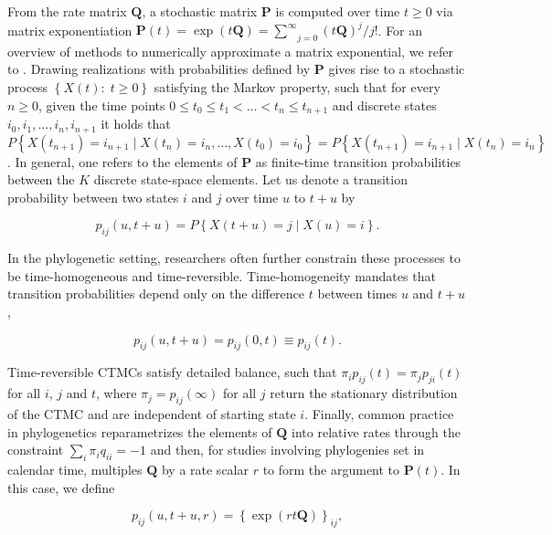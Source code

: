From the rate matrix $\mathbf{Q}$, a stochastic matrix $\mathbf{P}$ is computed over time $t \geq 0$ via matrix exponentiation $\mathbf{P}(t)=
\exp(t\mathbf{Q})
=\underset{j=0}{\overset{\infty}{\sum}}
(t\mathbf{Q})^{j} / j!$. For an overview of methods to numerically approximate a matrix exponential, we refer to \citet{Moler1978}.
%
Drawing realizations with probabilities defined by $\mathbf{P}$ gives rise to a stochastic process $\left\{ X(t):\; t\geq0\right\}$ satisfying the Markov property, such that for every $n\geq 0$, given the time points $0\leq t_{0}\leq t_{1}<\ldots<t_{n}\leq t_{n+1}$ and discrete states $i_{0},i_{1}, \ldots, i_{n},i_{n+1}$ it holds that %
%
$P\left\{ X(t_{n+1})=i_{n+1}\mid X(t_{n})=i_{n},\ldots, X(t_{0})=i_{0}\right\} =P\left\{ X(t_{n+1})=i_{n+1}\mid X(t_{n})=i_{n}\right\} $. 
%
In general, one refers to the elements of $\mathbf{P}$ as finite-time transition probabilities between the $K$ discrete state-space elements. Let us denote a transition probability between two states $i$ and $j$ over time $u$ to $t+u$ by

\begin{equation}
p_{ij}\left(u,t+u\right)=P\left\{ X(t+u)=j\mid X(u)=i\right\} .
\end{equation}

In the phylogenetic setting, researchers often further constrain these processes 
to be time-homogeneous and time-reversible. Time-homogeneity mandates that  transition probabilities depend only on the difference $t$ between times $u$ and $t + u$,

\begin{equation}
p_{ij}\left(u,t+u\right)= p_{ij}\left(0,t\right) \equiv p_{ij}\left(t\right) .
\end{equation}

Time-reversible CTMCs satisfy detailed balance, such that $\pi_{i}p_{ij}(t)=\pi_{j}p_{ji}(t)$ for all $i$, $j$ and $t$, where $\pi_j = p_{ij}(\infty)$ for all $j$ return the stationary distribution of the CTMC and are independent of starting state $i$.  
Finally, common practice in phylogenetics reparametrizes the elements of $\mathbf{Q}$ into relative rates through the constraint $\sum_i \pi_i q_{ii} = -1$ and then, for studies involving phylogenies set in calendar time, multiples $\mathbf{Q}$ by a rate scalar $r$ to form the argument to $\mathbf{P}(t)$. 
In this case, we define

\begin{equation}
p_{ij}(u,t+u,r) 
=
\left\{
\exp(
r  t  \mathbf{Q})
\right\}_{ij}
,
\label{eq:makeprobs}
\end{equation}


